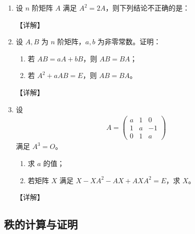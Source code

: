 \documentclass[12pt, a4paper, oneside, UTF8]{ctexbook}
\begin{document}
\begin{enumerate}[label=\arabic*.,start=3]
    \item 设 $ n $ 阶矩阵 $ A $ 满足 $ A^2 = 2A $，则下列结论不正确的是：
    
    \begin{solution}
    【详解】
    \end{solution}
    
    \item 设 $ A, B $ 为 $ n $ 阶矩阵，$ a, b $ 为非零常数。证明：
    \begin{enumerate}
        \item 若 $ AB = aA + bB $，则 $ AB = BA $；
        \item 若 $ A^2 + aAB = E $，则 $ AB = BA $。
    \end{enumerate}
    
    \begin{solution}
    【详解】
    \end{solution}
    
    \item 设 
    \begin{align*}
    A = \begin{pmatrix}
    a & 1 & 0 \\
    1 & a & -1 \\
    0 & 1 & a
    \end{pmatrix}
    \end{align*}
    满足 $ A^3 = O $。
    \begin{enumerate}
        \item 求 $ a $ 的值；
        \item 若矩阵 $ X $ 满足 $ X - XA^2 - AX + AXA^2 = E $，求 $ X $。
    \end{enumerate}
    
    \begin{solution}
    【详解】
    \end{solution}
\end{enumerate}

\subsection{秩的计算与证明}
\end{document}
